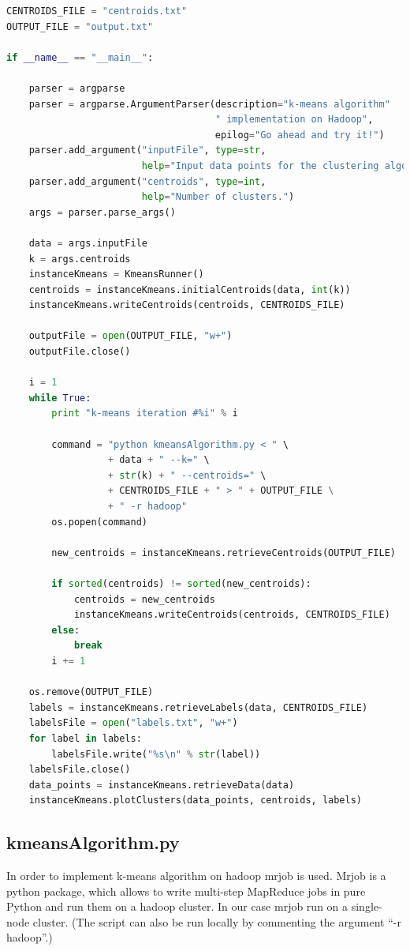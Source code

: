 \documentclass[11pt]{article}
\begin{document}
\begin{lstlisting}[language=Python]
CENTROIDS_FILE = "centroids.txt"
OUTPUT_FILE = "output.txt"

if __name__ == "__main__":

    parser = argparse
    parser = argparse.ArgumentParser(description="k-means algorithm"
                                     " implementation on Hadoop",
                                     epilog="Go ahead and try it!")
    parser.add_argument("inputFile", type=str,
                        help="Input data points for the clustering algorithm.")
    parser.add_argument("centroids", type=int,
                        help="Number of clusters.")
    args = parser.parse_args()

    data = args.inputFile
    k = args.centroids
    instanceKmeans = KmeansRunner()
    centroids = instanceKmeans.initialCentroids(data, int(k))
    instanceKmeans.writeCentroids(centroids, CENTROIDS_FILE)

    outputFile = open(OUTPUT_FILE, "w+")
    outputFile.close()

    i = 1
    while True:
        print "k-means iteration #%i" % i

        command = "python kmeansAlgorithm.py < " \
                  + data + " --k=" \
                  + str(k) + " --centroids=" \
                  + CENTROIDS_FILE + " > " + OUTPUT_FILE \
                  + " -r hadoop"
        os.popen(command)

        new_centroids = instanceKmeans.retrieveCentroids(OUTPUT_FILE)

        if sorted(centroids) != sorted(new_centroids):
            centroids = new_centroids
            instanceKmeans.writeCentroids(centroids, CENTROIDS_FILE)
        else:
            break
        i += 1

    os.remove(OUTPUT_FILE)
    labels = instanceKmeans.retrieveLabels(data, CENTROIDS_FILE)
    labelsFile = open("labels.txt", "w+")
    for label in labels:
        labelsFile.write("%s\n" % str(label))
    labelsFile.close()
    data_points = instanceKmeans.retrieveData(data)
    instanceKmeans.plotClusters(data_points, centroids, labels)

\end{lstlisting}

\subsection{kmeansAlgorithm.py}\label{kmeansAlgorithm.py}
In order to implement k-means algorithm on hadoop mrjob is used. Mrjob is
a python package, which allows to write multi-step MapReduce jobs in
pure Python and run them on a hadoop cluster. In our case mrjob run on a
single-node cluster. (The script can also be run locally by commenting the argument ``-r hadoop''.) 
\end{document}
